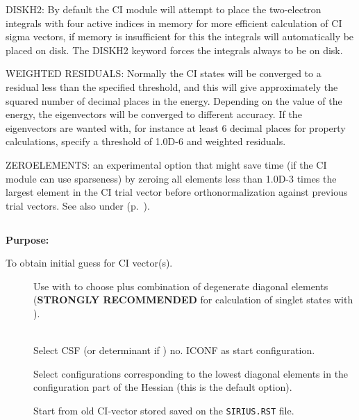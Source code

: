 
DISKH2: By default the CI module will attempt to place the two-electron
integrals with four active indices in memory for more efficient
calculation of CI sigma vectors, if memory is insufficient for this
the
integrals will automatically be placed on disk.  The DISKH2 keyword
forces the integrals always to be on disk.

WEIGHTED RESIDUALS:  Normally the CI states will be converged to a
residual less than the specified threshold, and this will give
approximately the squared number of decimal places in the energy.
Depending on the value of the energy, the eigenvectors will be converged
to different accuracy. If the eigenvectors are wanted with, for instance at
least 6 decimal places for property calculations, specify a threshold of
1.0D-6 and weighted residuals.

ZEROELEMENTS: an experimental option that might save time (if the CI
module can use sparseness) by zeroing all elements less than 1.0D-3
times the largest element in the CI trial vector before
orthonormalization against previous trial vectors.
See also  under 
(p.~\pageref{ref-optinp}).


\pagebreak[3]
\subsection{\label{ref-civinp}}

{\bf Purpose:}

To obtain initial guess for CI vector(s).

\begin{description}
\item[]
  Use with  to choose plus combination
  of degenerate   diagonal elements ({\bf STRONGLY RECOMMENDED} for
  calculation of singlet states  with ).

\item[]
   \\
  Select CSF (or determinant if ) no.
  ICONF as start configuration.

\item[]
  Select configurations corresponding to the lowest diagonal elements in
  the configuration part of the Hessian (this is the default option).

\item[]
  Start from old CI-vector stored saved on the \verb|SIRIUS.RST| file.


\end{description}

